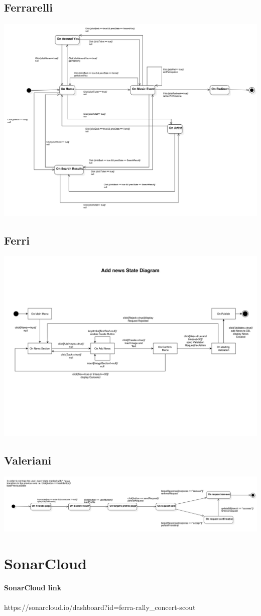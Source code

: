 \documentclass[11pt,a4paper]{article}
\begin{document}
\subsection{Ferrarelli}
\includegraphics[scale=0.4]{SDFerrarelli.jpg}
\subsection{Ferri}
\includegraphics[scale=0.2]{SDFerri.jpg}
\subsection{Valeriani}
\includegraphics[scale=0.4]{SDValeriani.jpg}
\section{SonarCloud}
\paragraph{SonarCloud link} https://sonarcloud.io/dashboard?id=ferra-rally\_concert-scout
\end{document}
